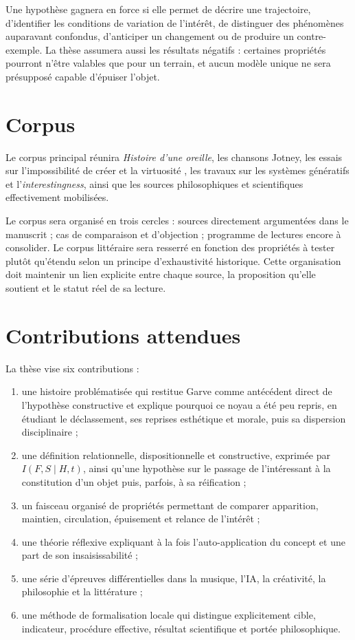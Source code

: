 \documentclass[11pt,a4paper]{article}
\begin{document}
Une hypothèse gagnera en force si elle permet de décrire une trajectoire,
d'identifier les conditions de variation de l'intérêt, de distinguer des
phénomènes auparavant confondus, d'anticiper un changement ou de produire un
contre-exemple. La thèse assumera aussi les résultats négatifs : certaines
propriétés pourront n'être valables que pour un terrain, et aucun modèle unique
ne sera présupposé capable d'épuiser l'objet.

\section{Corpus}

Le corpus principal réunira \emph{Histoire d'une oreille}, les chansons Jotney,
les essais sur l'impossibilité de créer et la virtuosité
\parencite{pachet2018oreille,pachet2026impossibilite,pachet2027virtuosite}, les
travaux sur les systèmes génératifs et l'\emph{interestingness}, ainsi que les
sources philosophiques et scientifiques effectivement mobilisées.

Le corpus sera organisé en trois cercles : sources directement argumentées dans
le manuscrit ; cas de comparaison et d'objection ; programme de lectures encore
à consolider. Le corpus littéraire sera resserré en fonction des propriétés à
tester plutôt qu'étendu selon un principe d'exhaustivité historique. Cette
organisation doit maintenir un lien explicite entre chaque source, la
proposition qu'elle soutient et le statut réel de sa lecture.

\section{Contributions attendues}

La thèse vise six contributions :

\begin{enumerate}
  \item une histoire problématisée qui restitue Garve comme antécédent direct de
        l'hypothèse constructive et explique pourquoi ce noyau a été peu repris,
        en étudiant le déclassement, ses reprises esthétique et morale, puis sa dispersion
        disciplinaire ;
  \item une définition relationnelle, dispositionnelle et constructive,
        exprimée par \(I(F,S\mid H,t)\), ainsi qu'une hypothèse sur le passage
        de l'intéressant à la constitution d'un objet puis, parfois, à sa
        réification ;
  \item un faisceau organisé de propriétés permettant de comparer apparition,
        maintien, circulation, épuisement et relance de l'intérêt ;
  \item une théorie réflexive expliquant à la fois l'auto-application du concept
        et une part de son insaisissabilité ;
  \item une série d'épreuves différentielles dans la musique, l'IA, la
        créativité, la philosophie et la littérature ;
  \item une méthode de formalisation locale qui distingue explicitement cible,
        indicateur, procédure effective, résultat scientifique et portée
        philosophique.
\end{enumerate}
\end{document}
